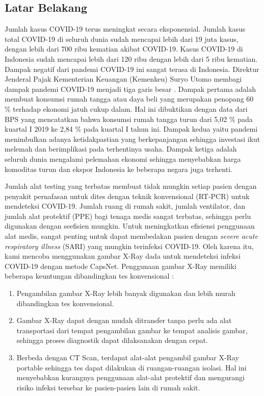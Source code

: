 \documentclass{article}
\begin{document}
	  \subsection{Latar Belakang}
	   Jumlah kasus COVID-19 terus meningkat secara eksponensial. Jumlah kasus total COVID-19 di seluruh dunia sudah mencapai lebih dari 19 juta kasus, dengan lebih dari 700 ribu kematian akibat COVID-19. Kasus COVID-19 di Indonesia sudah mencapai lebih dari 120 ribu dengan lebih dari 5 ribu kematian. Dampak negatif dari pandemi COVID-19 ini sangat terasa di Indonesia. Direktur Jenderal Pajak Kementerian Keuangan (Kemenkeu) Suryo Utomo membagi dampak pandemi COVID-19 menjadi tiga garis besar \cite{zuraya}. Dampak pertama adalah membuat konsumsi rumah tangga atau daya beli yang merupakan penopang 60 \% terhadap ekonomi jatuh cukup dalam. Hal ini dibuktikan dengan data dari BPS yang mencatatkan bahwa konsumsi rumah tangga turun dari 5,02 \% pada kuartal I 2019 ke 2,84 \% pada kuartal I tahun ini. Dampak kedua yaitu pandemi menimbulkan adanya ketidakpastian yang berkepanjangan sehingga investasi ikut melemah dan berimplikasi pada terhentinya usaha. Dampak ketiga adalah seluruh dunia mengalami pelemahan ekonomi sehingga menyebabkan harga komoditas turun dan ekspor Indonesia ke beberapa negara juga terhenti. 
	   \par
	   Jumlah alat testing yang terbatas membuat tidak mungkin setiap pasien dengan penyakit pernafasan untuk dites dengan teknik konvensional (RT-PCR) untuk mendeteksi COVID-19. Jumlah ruang di rumah sakit, jumlah ventilator, dan jumlah alat protektif (PPE) bagi tenaga medis sangat terbatas, sehingga perlu digunakan dengan seefisien mungkin. Untuk meningkatkan efisiensi penggunaan alat medis, sangat penting untuk dapat membedakan pasien dengan \textit{severe acute respiratory illness} (SARI) yang mungkin terinfeksi COVID-19. Oleh karena itu, kami mencoba menggunakan gambar X-Ray dada untuk mendeteksi infeksi COVID-19 dengan metode CapsNet.
	   Penggunaan gambar X-Ray memiliki beberapa keuntungan dibandingkan tes konvensional \cite{mangal} :
	   
	   \begin{enumerate}
	   	\item Pengambilan gambar X-Ray lebih banyak digunakan dan lebih murah dibandingkan tes konvensional.
	   	\item Gambar X-Ray dapat dengan mudah ditransfer tanpa perlu ada alat transportasi dari tempat pengambilan gambar ke tempat analisis gambar, sehingga proses diagnostik dapat dilaksanakan dengan cepat.
	   	\item Berbeda dengan CT Scan, terdapat alat-alat pengambil gambar X-Ray portable sehingga tes dapat dilakukan di ruangan-ruangan isolasi. Hal ini menyebabkan kurangnya penggunaan alat-alat protektif dan mengurangi risiko infeksi tersebar ke pasien-pasien lain di rumah sakit.
	   \end{enumerate}
	 
\end{document}
